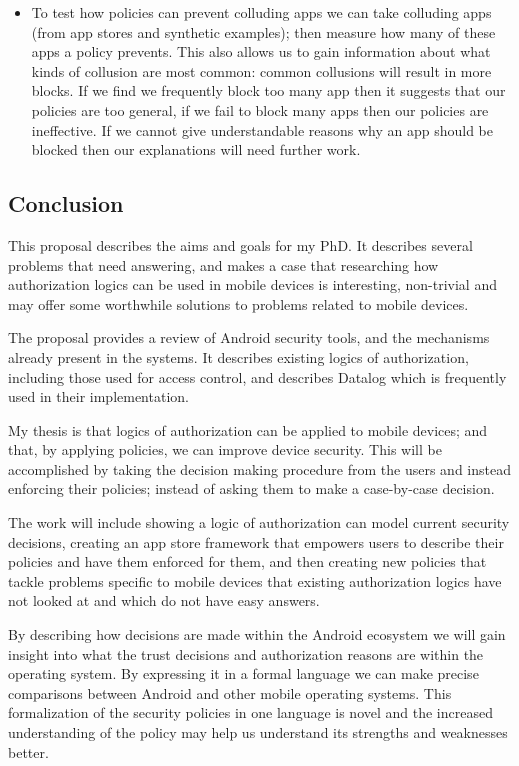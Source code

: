 \documentclass[a4paper,sfsidenotes]{%
  scrartcl%
}
\begin{document}
\begin{itemize}
  \item To test how policies can prevent colluding apps we can take colluding
  apps (from app stores and synthetic examples); then measure how many of these
  apps a policy prevents.  This also allows us to gain information about what
  kinds of collusion are most common: common collusions will result in more
  blocks.  If we find we frequently block too many app then it suggests that our
  policies are too general, if we fail to block many apps then our policies are
  ineffective.  If we cannot give understandable reasons why an app should be
  blocked then our explanations will need further work.

\end{itemize}

\subsection{Conclusion}

This proposal describes the aims and goals for my PhD.  It describes several
problems that need answering, and makes a case that researching how
authorization logics can be used in mobile devices is interesting, non-trivial
and may offer some worthwhile solutions to problems related to mobile devices.

The proposal provides a review of Android security tools, and the mechanisms
already present in the systems.  It describes existing logics of authorization,
including those used for access control, and describes Datalog which is
frequently used in their implementation. 

My thesis is that logics of authorization can be applied to mobile devices; and
that, by applying policies, we can improve device security.  This will be
accomplished by taking the decision making procedure from the users and instead
enforcing their policies; instead of asking them to make a case-by-case
decision.

The work will include showing a logic of authorization can model current
security decisions, creating an app store framework that empowers users to
describe their policies and have them enforced for them, and then creating new
policies that tackle problems specific to mobile devices that existing
authorization logics have not looked at and which do not have easy answers.


By describing how decisions are made within the Android ecosystem we will gain
insight into what the trust decisions and authorization reasons are within the
operating system.  By expressing it in a formal language we can make precise
comparisons between Android and other mobile operating systems.  This
formalization of the security policies in one language is novel and the
increased understanding of the policy may help us understand its strengths and
weaknesses better.
\end{document}
